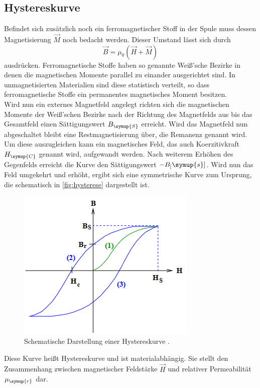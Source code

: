 \subsection{Hystereskurve}
\label{sec:hysterese}
Befindet sich zusätzlich noch ein ferromagnetischer Stoff in der Spule muss dessen Magnetisierung $\vec{M}$
noch bedacht werden. Dieser Umstand lässt sich durch
\begin{equation}
    \vec{B} = \mu_0 (\vec{H} + \vec{M})
\end{equation}
ausdrücken. Ferromagnetische Stoffe haben so genannte Weiß'sche Bezirke in denen die magnetischen
Momente parallel zu einander ausgerichtet sind. In unmagnetisierten Materialien sind diese statistisch verteilt,
so dass ferromagnetische Stoffe ein permanentes magnetisches Moment besitzen.\\
Wird nun ein externes Magnetfeld angelegt richten sich die magnetischen Momente der Weiß'schen Bezirke
nach der Richtung des Magnetfelds aus bis das Gesamtfeld einen Sättigungswert
$B_{\symup{S}}$ erreicht. Wird das Magnetfeld nun abgeschaltet bleibt eine Restmagnetisierung
über, die Remanenz genannt wird. Um diese auszugleichen kann ein magnetisches Feld, das
auch Koerzitivkraft $H_{\symup{C}}$ genannt wird, aufgewandt werden. Nach weiterem Erhöhen des Gegenfelds
erreicht die Kurve den Sättigungswert $-B_[\symup{s}]$. Wird nun das Feld umgekehrt und erhöht, ergibt sich eine
symmetrische Kurve zum Ursprung, die schematisch in \autoref{fig:hysterese} dargestellt ist.
\begin{figure}[h]
    \centering
    \includegraphics[scale=0.5]{hysterese.png}
    \caption{Schematische Darstellung einer Hystereskurve \cite{sample}.}
    \label{fig:hysterese}
\end{figure}
Diese Kurve heißt Hystereskurve und ist materialabhängig. Sie stellt den Zusammenhang zwischen magnetischer Feldstärke
$\vec{H}$ und relativer Permeabilität $\mu_{\symup{r}}$ dar.